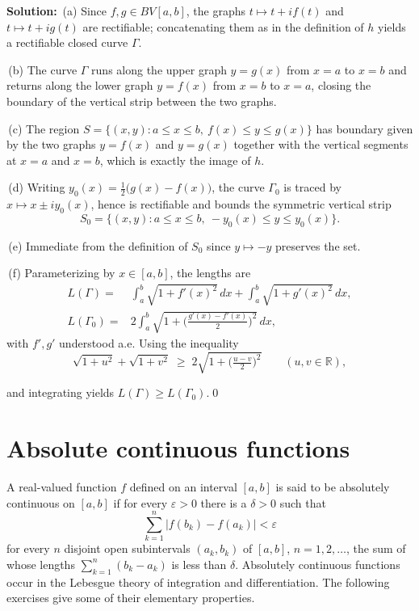 \bigskip\noindent\textbf{Solution:}
\,(a) Since $f,g\in BV[a,b]$, the graphs $t\mapsto t+if(t)$ and $t\mapsto t+ig(t)$ are rectifiable; concatenating them as in the definition of $h$ yields a rectifiable closed curve $\Gamma$.

\,(b) The curve $\Gamma$ runs along the upper graph $y=g(x)$ from $x=a$ to $x=b$ and returns along the lower graph $y=f(x)$ from $x=b$ to $x=a$, closing the boundary of the vertical strip between the two graphs.

\,(c) The region $S=\{(x,y): a\le x\le b,\ f(x)\le y\le g(x)\}$ has boundary given by the two graphs $y=f(x)$ and $y=g(x)$ together with the vertical segments at $x=a$ and $x=b$, which is exactly the image of $h$.

\,(d) Writing $y_0(x)=\tfrac12\big(g(x)-f(x)\big)$, the curve $\Gamma_0$ is traced by $x\mapsto x\pm i y_0(x)$, hence is rectifiable and bounds the symmetric vertical strip
\[S_0=\{(x,y): a\le x\le b,\ -y_0(x)\le y\le y_0(x)\}.\]

\,(e) Immediate from the definition of $S_0$ since $y\mapsto -y$ preserves the set.

\,(f) Parameterizing by $x\in[a,b]$, the lengths are
\begin{align*}
L(\Gamma)=&\int_a^b\!\sqrt{1+f'(x)^2}\,dx+\int_a^b\!\sqrt{1+g'(x)^2}\,dx,\\
L(\Gamma_0)=&2\int_a^b\!\sqrt{1+\Big(\tfrac{g'(x)-f'(x)}{2}\Big)^{\!2}}\,dx,
\end{align*}
with $f',g'$ understood a.e. Using the inequality
\[\sqrt{1+u^2}+\sqrt{1+v^2}\;\ge\;2\sqrt{1+\Big(\tfrac{u-v}{2}\Big)^{\!2}}\qquad(u,v\in\mathbb{R}),\]

and integrating yields $L(\Gamma)\ge L(\Gamma_0)$.\qed
\section{Absolute continuous functions}
A real-valued function $f$ defined on an interval $[a,b]$ is said to be absolutely continuous on $[a,b]$ if for every $\varepsilon > 0$ there is a $\delta > 0$ such that
\[\sum_{k=1}^{n} |f(b_k) - f(a_k)| < \varepsilon\]
for every $n$ disjoint open subintervals $(a_k, b_k)$ of $[a, b]$, $n = 1, 2, \ldots$, the sum of whose lengths $\sum_{k=1}^{n} (b_k - a_k)$ is less than $\delta$.
Absolutely continuous functions occur in the Lebesgue theory of integration and differentiation. The following exercises give some of their elementary properties.



